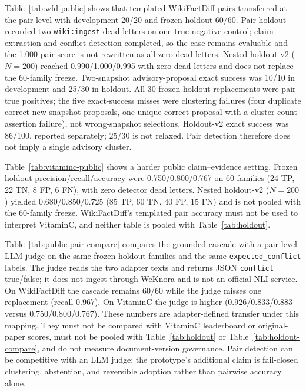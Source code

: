 \documentclass[conference]{IEEEtran}
\begin{document}
Table~\ref{tab:wfd-public} shows that templated WikiFactDiff pairs transferred at the pair level with development 20/20 and frozen holdout 60/60. Pair holdout recorded two \texttt{wiki:ingest} dead letters on one true-negative control; claim extraction and conflict detection completed, so the case remains evaluable and the 1.000 pair score is not rewritten as all-zero dead letters. Nested holdout-v2 ($N{=}200$) reached 0.990/1.000/0.995 with zero dead letters and does not replace the 60-family freeze. Two-snapshot advisory-proposal exact success was 10/10 in development and 25/30 in holdout. All 30 frozen holdout replacements were pair true positives; the five exact-success misses were clustering failures (four duplicate correct new-snapshot proposals, one unique correct proposal with a cluster-count assertion failure), not wrong-snapshot selections. Holdout-v2 exact success was 86/100, reported separately; 25/30 is not relaxed. Pair detection therefore does not imply a single advisory cluster.

Table~\ref{tab:vitaminc-public} shows a harder public claim--evidence setting. Frozen holdout precision/recall/accuracy were 0.750/0.800/0.767 on 60 families (24 TP, 22 TN, 8 FP, 6 FN), with zero detector dead letters. Nested holdout-v2 ($N{=}200$) yielded 0.680/0.850/0.725 (85 TP, 60 TN, 40 FP, 15 FN) and is not pooled with the 60-family freeze. WikiFactDiff's templated pair accuracy must not be used to interpret VitaminC, and neither table is pooled with Table~\ref{tab:holdout}.

Table~\ref{tab:public-pair-compare} compares the grounded cascade with a pair-level LLM judge on the same frozen holdout families and the same \texttt{expected\_conflict} labels. The judge reads the two adapter texts and returns JSON \texttt{conflict} true/false; it does not ingest through WeKnora and is not an official NLI service. On WikiFactDiff the cascade remains 60/60 while the judge misses one replacement (recall 0.967). On VitaminC the judge is higher (0.926/0.833/0.883 versus 0.750/0.800/0.767). These numbers are adapter-defined transfer under this mapping. They must not be compared with VitaminC leaderboard or original-paper scores, must not be pooled with Table~\ref{tab:holdout} or Table~\ref{tab:holdout-compare}, and do not measure document-version governance. Pair detection can be competitive with an LLM judge; the prototype's additional claim is fail-closed clustering, abstention, and reversible adoption rather than pairwise accuracy alone.
\end{document}
